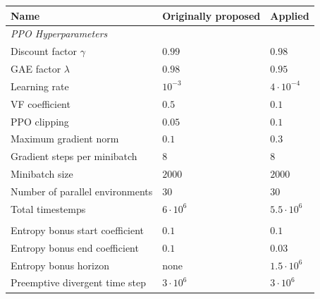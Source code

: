 \begin{table}[htbp]
    \small
    \centering
    \begin{tabular}{lll}
      \toprule
      \textbf{Name}                                & Originally proposed     & \textbf{Applied}         \\ \midrule
      \textit{PPO Hyperparameters}     &                                   &                                   \\ \midrule            
      Discount factor $\gamma$                     & $0.99$                            & $0.98$                            \\
      GAE factor $\lambda$                         & $0.98$                            & $0.95$                            \\
      Learning rate                                & $10^{-3}$                         & $4 \cdot 10^{-4}$                               \\
      VF coefficient                               & $0.5$                             & $0.1$                             \\
      PPO clipping                                 & $0.05$                            & $0.1$                             \\
      Maximum gradient norm                        & $0.1$                             & $0.3$                             \\
      Gradient steps per minibatch                 & $8$                               & $8$                               \\      
      Minibatch size                               & $2000$                            & $2000$                            \\
      Number of parallel environments              & $30$                              & $30$                              \\
      Total timestemps                             & $6\cdot10^6$                      & $5.5 \cdot 10^6$                  \\            \\
      Entropy bonus start coefficient              & $0.1$                             & $0.1$                             \\
      Entropy bonus end coefficient                & $0.1$                             & $0.03$                            \\
      Entropy bonus horizon                        & none                              & $1.5\cdot 10^6$                   \\
      Preemptive divergent time step               & $3\cdot 10^6$                     & $3\cdot 10^6$                     \\
      \midrule
  

\end{tabular}
\end{table}
